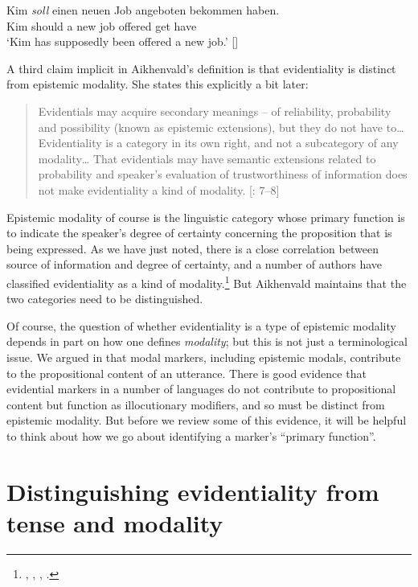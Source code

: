 \ea \label{ex:17.4}
\gll Kim  \textit{soll}  einen  neuen  Job  angeboten  bekommen  haben.\\
Kim  should a  new  job  offered  get  have\\
\glt ‘Kim has supposedly been offered a new job.’  [\citealt{vonFintel2006}]
\z


A third claim implicit in Aikhenvald’s definition is that evidentiality is distinct from epistemic modality. She states this explicitly a bit later:


\begin{quote}
Evidentials may acquire secondary meanings – of reliability, probability and possibility (known as epistemic extensions), but they do not have to… Evidentiality is a category in its own right, and not a subcategory of any modality… That evidentials may have semantic extensions related to probability and speaker’s evaluation of trustworthiness of information does not make evidentiality a kind of modality. [\citealt{Aikhenvald2004}: 7–8]
\end{quote}


Epistemic modality of course is the linguistic category whose primary function is to indicate the speaker’s degree of certainty concerning the proposition that is being expressed. As we have just noted, there is a close correlation between source of information and degree of certainty, and a number of authors have classified evidentiality as a kind of modality.\footnote{\citet{Palmer1986}, \citet{Frawley1992}, \citet{MatthewsonEtAl2007}, \citet{Izvorski1997}.} But Aikhenvald maintains that the two categories need to be distinguished. 



Of course, the question of whether evidentiality is a type of epistemic modality depends in part on how one defines \textit{modality}; but this is not just a terminological issue. We argued in  that modal markers, including epistemic modals, contribute to the propositional content of an utterance. There is good evidence that evidential markers in a number of languages do not contribute to propositional content but function as illocutionary modifiers, and so must be distinct from epistemic modality. But before we review some of this evidence, it will be helpful to think about how we go about identifying a marker’s “primary function”.


\section{Distinguishing evidentiality from tense and modality}\label{sec:17.4}


